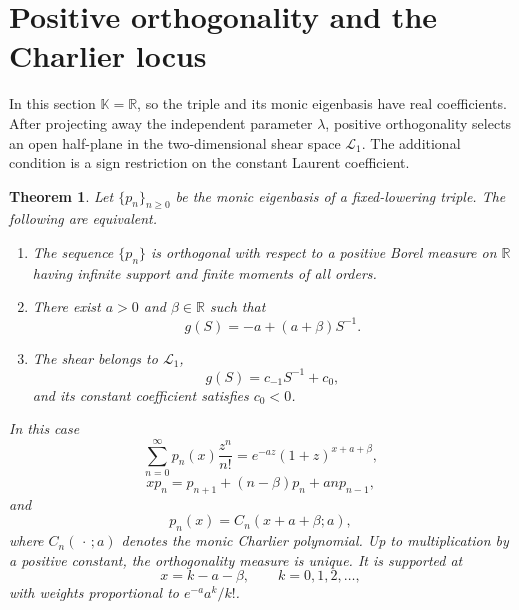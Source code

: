 \documentclass[11pt,reqno]{amsart}
\numberwithin{equation}{section}
\newtheorem{theorem}{Theorem}[section]
\theoremstyle{definition}
\theoremstyle{remark}
\newcommand{\K}{\mathbb K}
\newcommand{\R}{\mathbb R}
\newcommand{\calL}{\mathcal L}
\begin{document}
\section{Positive orthogonality and the Charlier locus}

In this section $\K=\R$, so the triple and its monic eigenbasis have real coefficients.  After projecting away the independent parameter $\lambda$, positive orthogonality selects an open half-plane in the two-dimensional shear space $\calL_1$.  The additional condition is a sign restriction on the constant Laurent coefficient.

\begin{theorem}\label{thm:positive}
Let $\{p_n\}_{n\ge0}$ be the monic eigenbasis of a fixed-lowering triple.  The following are equivalent.
\begin{enumerate}[label=\textup{(\roman*)},leftmargin=2.3em]
\item The sequence $\{p_n\}$ is orthogonal with respect to a positive Borel measure on $\R$ having infinite support and finite moments of all orders.
\item There exist $a>0$ and $\beta\in\R$ such that
\begin{equation}\label{eq:charlier-g}
 g(S)=-a+(a+\beta)S^{-1}.
\end{equation}
\item The shear belongs to $\calL_1$,
\[
 g(S)=c_{-1}S^{-1}+c_0,
\]
and its constant coefficient satisfies $c_0<0$.
\end{enumerate}
In this case
\begin{equation}\label{eq:charlier-egf}
 \sum_{n=0}^{\infty}p_n(x)\frac{z^n}{n!}
 =e^{-az}(1+z)^{x+a+\beta},
\end{equation}
\begin{equation}\label{eq:charlier-recurrence}
 xp_n=p_{n+1}+(n-\beta)p_n+anp_{n-1},
\end{equation}
and
\begin{equation}\label{eq:charlier-identification}
 p_n(x)=C_n(x+a+\beta;a),
\end{equation}
where $C_n(\,\cdot\,;a)$ denotes the monic Charlier polynomial.  Up to multiplication by a positive constant, the orthogonality measure is unique.  It is supported at
\[
 x=k-a-\beta,
 \qquad k=0,1,2,\ldots,
\]
with weights proportional to $e^{-a}a^k/k!$.
\end{theorem}
\end{document}
